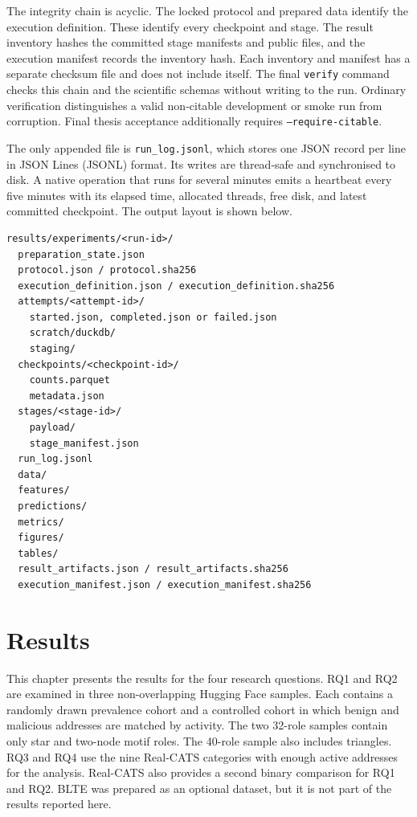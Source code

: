 \documentclass{thesisclass}
\begin{document}
The integrity chain is acyclic. The locked protocol and prepared data identify
the execution definition. These identify every checkpoint and stage. The
result inventory hashes the committed stage manifests and public files, and the
execution manifest records the inventory hash. Each inventory and manifest has
a separate checksum file and does not include itself. The final
\texttt{verify} command checks this chain and the scientific schemas without
writing to the run. Ordinary verification distinguishes a valid non-citable
development or smoke run from corruption. Final thesis acceptance additionally
requires \texttt{--require-citable}.

The only appended file is \texttt{run\_log.jsonl}, which stores one JSON record
per line in JSON Lines (JSONL) format. Its writes are thread-safe
and synchronised to disk. A native operation that runs for several minutes
emits a heartbeat every five minutes with its elapsed time, allocated threads,
free disk, and latest committed checkpoint. The output layout is shown below.

\begin{lstlisting}[caption={Locked Results artifact layout.},
  label={lst:filenames}]
results/experiments/<run-id>/
  preparation_state.json
  protocol.json / protocol.sha256
  execution_definition.json / execution_definition.sha256
  attempts/<attempt-id>/
    started.json, completed.json or failed.json
    scratch/duckdb/
    staging/
  checkpoints/<checkpoint-id>/
    counts.parquet
    metadata.json
  stages/<stage-id>/
    payload/
    stage_manifest.json
  run_log.jsonl
  data/
  features/
  predictions/
  metrics/
  figures/
  tables/
  result_artifacts.json / result_artifacts.sha256
  execution_manifest.json / execution_manifest.sha256
\end{lstlisting}


\chapter{Results}
\label{ch:results}


This chapter presents the results for the four research questions. RQ1 and RQ2
are examined in three non-overlapping Hugging Face samples. Each contains a
randomly drawn prevalence cohort and a controlled cohort in which benign and
malicious addresses are matched by activity. The
two 32-role samples contain only star and two-node motif roles. The 40-role
sample also includes triangles. RQ3 and RQ4 use the nine
Real-CATS categories with enough active addresses for the analysis. Real-CATS
also provides a second binary comparison for RQ1 and RQ2. BLTE was prepared as
an optional dataset, but it is not part of the results reported here.
\end{document}
